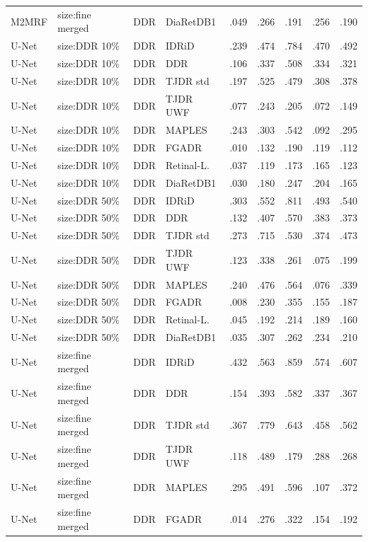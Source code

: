 \begin{landscape}
{\begin{longtable}{l l l l c c c c c}
M2MRF & size:fine merged & DDR & DiaRetDB1 & .049 & .266 & .191 & .256 & .190 \\
U-Net & size:DDR 10\% & DDR & IDRiD & .239 & .474 & .784 & .470 & .492 \\
U-Net & size:DDR 10\% & DDR & DDR & .106 & .337 & .508 & .334 & .321 \\
U-Net & size:DDR 10\% & DDR & TJDR std & .197 & .525 & .479 & .308 & .378 \\
U-Net & size:DDR 10\% & DDR & TJDR UWF & .077 & .243 & .205 & .072 & .149 \\
U-Net & size:DDR 10\% & DDR & MAPLES & .243 & .303 & .542 & .092 & .295 \\
U-Net & size:DDR 10\% & DDR & FGADR & .010 & .132 & .190 & .119 & .112 \\
U-Net & size:DDR 10\% & DDR & Retinal-L. & .037 & .119 & .173 & .165 & .123 \\
U-Net & size:DDR 10\% & DDR & DiaRetDB1 & .030 & .180 & .247 & .204 & .165 \\
U-Net & size:DDR 50\% & DDR & IDRiD & .303 & .552 & .811 & .493 & .540 \\
U-Net & size:DDR 50\% & DDR & DDR & .132 & .407 & .570 & .383 & .373 \\
U-Net & size:DDR 50\% & DDR & TJDR std & .273 & .715 & .530 & .374 & .473 \\
U-Net & size:DDR 50\% & DDR & TJDR UWF & .123 & .338 & .261 & .075 & .199 \\
U-Net & size:DDR 50\% & DDR & MAPLES & .240 & .476 & .564 & .076 & .339 \\
U-Net & size:DDR 50\% & DDR & FGADR & .008 & .230 & .355 & .155 & .187 \\
U-Net & size:DDR 50\% & DDR & Retinal-L. & .045 & .192 & .214 & .189 & .160 \\
U-Net & size:DDR 50\% & DDR & DiaRetDB1 & .035 & .307 & .262 & .234 & .210 \\
U-Net & size:fine merged & DDR & IDRiD & .432 & .563 & .859 & .574 & .607 \\
U-Net & size:fine merged & DDR & DDR & .154 & .393 & .582 & .337 & .367 \\
U-Net & size:fine merged & DDR & TJDR std & .367 & .779 & .643 & .458 & .562 \\
U-Net & size:fine merged & DDR & TJDR UWF & .118 & .489 & .179 & .288 & .268 \\
U-Net & size:fine merged & DDR & MAPLES & .295 & .491 & .596 & .107 & .372 \\
U-Net & size:fine merged & DDR & FGADR & .014 & .276 & .322 & .154 & .192 \\

\end{longtable}}
\end{landscape}
